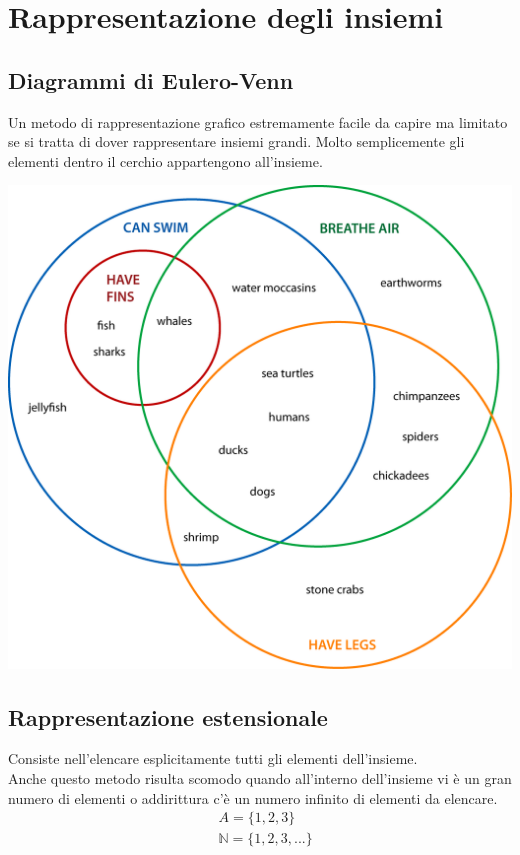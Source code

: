 \section{Rappresentazione degli insiemi}

\subsection{Diagrammi di Eulero-Venn}
Un metodo di rappresentazione grafico estremamente facile da capire ma limitato se si tratta di dover rappresentare insiemi grandi.
Molto semplicemente gli elementi dentro il cerchio appartengono all'insieme. \\
\begin{center}
    \includegraphics[scale=0.60]{Insiemi/venn-diagram1.png}
\end{center}

\subsection{Rappresentazione estensionale}
Consiste nell'elencare esplicitamente tutti gli elementi dell'insieme. \\
Anche questo metodo risulta scomodo quando all'interno dell'insieme vi è un gran numero
di elementi o addirittura c'è un numero infinito di elementi da elencare.
\begin{align*}
    &A = \{1, 2, 3\} \\
    &\mathbb{N} = \{1, 2, 3, ...\}
\end{align*}
